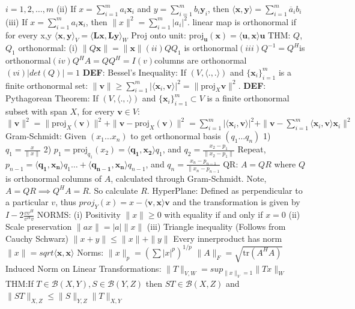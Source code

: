 \documentclass{article}
\theoremstyle{definition}
\begin{document}
{$i=1,2,\dots,m$ (ii) If $x = \sum_{i=1}^m a_i\textbf{x}_i$ and $y = \sum_{i=1}^m b_i\textbf{y}_i$, then $\langle \textbf{x}, \textbf{y} \rangle = \sum_{i=1}^m \overline{a}_ib_i$ (iii) If $x = \sum_{i=1}^m a_i\textbf{x}_i$, then $\|x\|^2 = \sum_{i=1}^m |a_i|^2$. 
linear map is orthonormal if for every x,y $\langle \mathbf{x}, \mathbf{y} \rangle _V = \langle \mathbf{Lx}, \mathbf{Ly} \rangle _W$
Proj onto unit: $\text{proj}_\mathbf{u}(\mathbf{x}) = \langle \mathbf{u}, \mathbf{x} \rangle \mathbf{u}$
THM: $Q$, $Q_1$ orthonormal: (i) $\|Q \mathbf{x}\| = \|\mathbf{x}\| 
(ii) QQ_1$ is orthonormal$
(iii) Q^{-1} = Q^H $is orthonormal$
(iv) Q^HA = QQ^H = I
(v) $columns are orthonormal$
(vi) |det(Q)| = 1$
\textbf{DEF}: Bessel's Inequality: If $(V, \langle .,. \rangle)$ and $\{ \textbf{x}_i \}_{i=1}^m$ is a finite orthonormal set: $\|\textbf{v}\| \geq \sum_{i=1}^m | \langle \textbf{x}_i, \textbf{v} \rangle |^2 = \| \text{proj}_X\textbf{v} \|^2$. 
\textbf{DEF}: Pythagorean Theorem: If $(V, \langle .,. \rangle)$ and $\{ \textbf{x}_i \}_{i=1}^m \subset V$ is a finite orthonormal subset with span $X$, for every $\textbf{v} \in V$: $\|\textbf{v} \|^2 = \|\text{proj}_X(\textbf{v}) \|^2 + \| \textbf{v} - \text{proj}_X(\textbf{v}) \|^2 = \sum_{i=1}^m |\langle \textbf{x}_i, \textbf{v} \rangle |^2 +  \| \textbf{v} - \sum_{i=1}^m \langle \textbf{x}_i, \textbf{v} \rangle \textbf{x}_i \|^2$
Gram-Schmidt: Given $(x_1\dots x_n)$ to get orthonormal basis $(q_1 \dots q_n)$ 1) $q_1 = \frac{x}{\|x\|}$ 
2) $p_1 = \text{proj}_{q_1}(x_2) = \langle \mathbf{q_1}, \mathbf{x_2} \rangle q_1$,
and $q_2 = \frac{x_2 - p_1}{\|x_2 - p_1\|}$
Repeat, $p_{n-1} = \langle \mathbf{q_1}, \mathbf{x_n} \rangle q_1 \dots + \langle \mathbf{q_{n-1}}, \mathbf{x_n} \rangle q_{n-1}$, and $ q_n = \frac{x_n - p_{n-1}}{\|x_n - p_{n-1}}$
QR: $A=QR$ where $Q$ is orthonormal columns of $A$, calculated through Gram-Schmidt.
Note, $A=QR \implies Q^HA=R$. So calculate $R$.
HyperPlane: Defined as perpendicular to a particular $v$, thus $proj_Y(x) = x - \langle \mathbf{v}, \mathbf{x} \rangle \mathbf{v}$ and the transformation is given by $I - 2 \frac{vv^H}{v^Hv}$
NORMS: (i) Positivity $\|x\| \geq 0$ with equality if and only if $x=0$
(ii) Scale preservation $\|ax\| = |a| \|x\|$
(iii) Triangle inequality (Follows from Cauchy Schwarz) $\|x+y\| \leq \|x\|+\|y\|$ Every innerproduct has norm $\|x\| = sqrt{\langle \mathbf{x}, \mathbf{x} \rangle }$
Norms: $\|x\|_p = (\sum |x|^p)^{1/p}$  $\|A\|_F = \sqrt{\text{tr}(A^HA)}$
Induced Norm on Linear Transformations: $\|T\|_{V,W} = sup_{\|x\|_V=1} \|Tx\|_W$
THM:If $T \in \mathscr{B}(X,Y), S\in \mathscr{B}(Y,Z)$ then $ ST \in \mathscr{B}(X,Z)$ and $ \|ST\|_{X,Z} \leq \|S\|_{Y,Z}\|T\|_{X,Y}$
$$}
\end{document}
